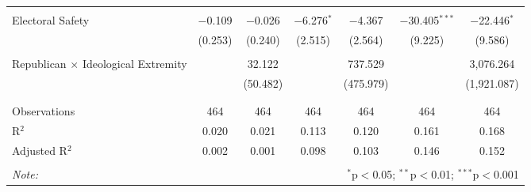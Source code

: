 \begin{tabular}{@{\extracolsep{5pt}}lcccccc}
  & & & & & & \\ 
 Electoral Safety & $-$0.109 & $-$0.026 & $-$6.276$^{*}$ & $-$4.367 & $-$30.405$^{***}$ & $-$22.446$^{*}$ \\ 
  & (0.253) & (0.240) & (2.515) & (2.564) & (9.225) & (9.586) \\ 
  & & & & & & \\ 
 Republican $\times$ Ideological Extremity &  & 32.122 &  & 737.529 &  & 3,076.264 \\ 
  &  & (50.482) &  & (475.979) &  & (1,921.087) \\ 
  & & & & & & \\ 
\hline \\[-1.8ex] 
Observations & 464 & 464 & 464 & 464 & 464 & 464 \\ 
R$^{2}$ & 0.020 & 0.021 & 0.113 & 0.120 & 0.161 & 0.168 \\ 
Adjusted R$^{2}$ & 0.002 & 0.001 & 0.098 & 0.103 & 0.146 & 0.152 \\ 
\hline 
\hline \\[-1.8ex] 
\textit{Note:}  & \multicolumn{6}{r}{$^{*}$p$<$0.05; $^{**}$p$<$0.01; $^{***}$p$<$0.001} \\ 
\end{tabular} 
